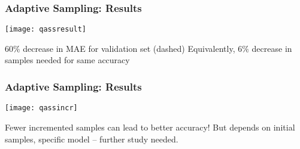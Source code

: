 \begin{frame}
    \frametitle{Adaptive Sampling: Results}
    \vspace{-20pt}
    \begin{center}
    \texttt{[image: qassresult]}
    \end{center}
    
	\alert{$60\%$ decrease} in MAE for validation set (dashed) \newline
	Equivalently, \alert{$6\%$ decrease} in samples needed for same accuracy

\end{frame}


\begin{frame}
    \frametitle{Adaptive Sampling: Results}
    \vspace{-20pt}
    \begin{center}
    \texttt{[image: qassincr]}
    \end{center}
    
    Fewer incremented samples can lead to better accuracy! \newline
    But depends on initial samples, specific model -- further study needed.

\end{frame}
